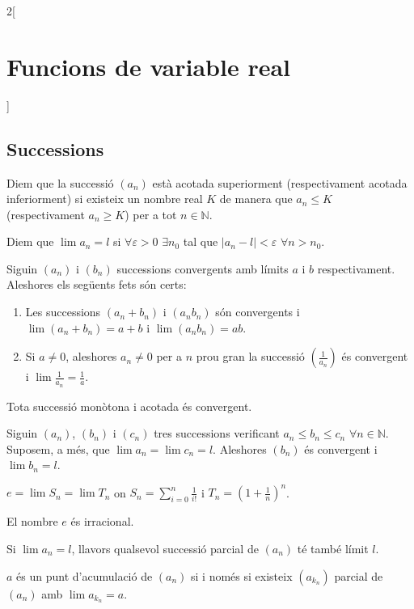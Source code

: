 \documentclass[../../../main.tex]{subfiles}
\begin{document}
\begin{multicols}{2}[\section{Funcions de variable real}]
\subsection{Successions}
\begin{definition}
Diem que la successió $(a_n)$ està acotada superiorment (respectivament acotada inferiorment) si existeix un nombre real $K$ de manera que $a_n\leq K$ (respectivament $a_n\geq K$) per a tot $n\in\mathbb{N}$.
\end{definition}
\begin{definition}
Diem que $\lim a_n=l$ si $\forall\varepsilon>0$ $\exists n_0$ tal que $|a_n-l|<\varepsilon$ $\forall n>n_0$.
\end{definition}
\begin{lemma}
Siguin $(a_n)$ i $(b_n)$ successions convergents amb límits $a$ i $b$ respectivament. Aleshores els següents fets són certs:
\begin{enumerate}
    \item Les successions $(a_n+b_n)$ i $(a_nb_n)$ són convergents i $\lim (a_n+b_n)=a+b$ i $\lim (a_nb_n)=ab$.
    \item Si $a\ne 0$, aleshores $a_n\ne 0$ per a $n$ prou gran la successió $(\frac{1}{a_n})$ és convergent i $\lim \frac{1}{a_n}=\frac{1}{a}$.
\end{enumerate}
\end{lemma}
\begin{theorem}
Tota successió monòtona i acotada és convergent.
\end{theorem}
\begin{lemma}
Siguin $(a_n)$, $(b_n)$ i $(c_n)$ tres successions verificant $a_n\leq b_n\leq c_n$ $\forall n\in\mathbb{N}$. Suposem, a més, que $\lim a_n=\lim c_n=l$. Aleshores $(b_n)$ és convergent i $\lim b_n=l$.
\end{lemma}
\begin{lemma}
$e=\lim S_n=\lim T_n$ on $S_n=\sum_{i=0}^n \frac{1}{i!}$ i $T_n=\left(1+\frac{1}{n}\right)^n$.
\end{lemma}
\begin{theorem}
El nombre $e$ és irracional.
\end{theorem}
\begin{lemma}
Si $\lim a_n=l$, llavors qualsevol successió parcial de $(a_n)$ té també límit $l$. 
\end{lemma}
\begin{prop}
$a$ és un punt d'acumulació de $(a_n)$ si i només si existeix $(a_{k_n})$ parcial de $(a_n)$ amb $\lim a_{k_n}=a$.

\end{prop}
\end{multicols}
\end{document}
